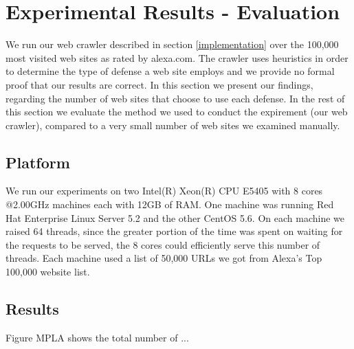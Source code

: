\label{evaluation}
\section{Experimental Results - Evaluation}
We run our web crawler described in section \ref{implementation} over the 100,000 most visited web sites as
rated by alexa.com.  The crawler uses heuristics in order to determine the type of defense a web site employs and
we provide no formal proof that our results are correct.  In this section we present our findings, regarding the
number of web sites that choose to use each defense.  In the rest of this section we evaluate the method we
used to conduct the expirement (our web crawler), compared to a very small number of web sites we examined manually. 

\subsection{Platform} 
We run our experiments on two Intel(R) Xeon(R) CPU E5405 with 8 cores @2.00GHz machines each with 12GB of RAM. 
One machine was running Red Hat Enterprise Linux Server 5.2 and the other CentOS 5.6. 
On each machine we raised 64 threads, since the greater portion of the time was spent on waiting 
for the requests to be served, the 8 cores could efficiently serve this number of threads.  Each machine used a list 
of 50,000 URLs we got from Alexa's Top 100,000 website list.  

\subsection{Results}
Figure MPLA shows the total number of ...

